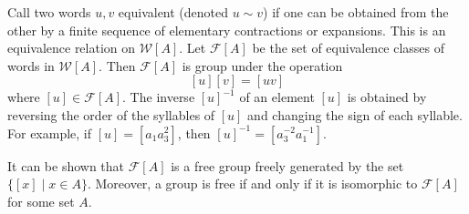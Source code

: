 \documentclass[12pt]{article}
\def\FA{\mathcal{F}[A]}
\def\WA{\mathcal{W}[A]}
\begin{document}
Call two words $u,v$ equivalent (denoted $u \sim v$) if one can be obtained from the other by a finite sequence of elementary contractions or expansions. This is an equivalence relation on $\WA$.  Let $\FA$ be the set of equivalence classes of words in $\WA$. Then $\FA$ is group under the operation $$[u][v] = [uv]$$
where $[u] \in \FA$. The inverse $[u]^{-1}$ of an element $[u]$ is obtained by reversing the order of the syllables of $[u]$ and changing the sign of each syllable. For example, if $[u] = [a_1a_3^{2}]$, then $[u]^{-1} = [a_3^{-2}a_1^{-1}]$. 

It can be shown that $\FA$ is a free group freely generated by the set $\{[x]\mid x\in A\}$. Moreover, a group is free if and only if it is isomorphic to $\FA$ for some set $A$.
\end{document}
